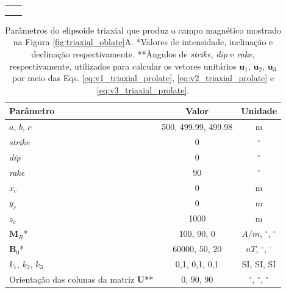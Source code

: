 \begin{table}[h!]
	\begin{center}
		\begin{tabular}{lc}
			
			&  \\
			& \\
			& \\
		\end{tabular}
	\end{center}
\end{table}

\begin{table}[h!]
	\begin{center}
		\begin{tabular}{|l|c|c|}
			\hline
			\textbf{Parâmetro}  & \textbf{Valor} & \textbf{Unidade} \\
			\hline 
			$a$, $b$, $c$   & 500, 499.99, 499.98 & m\\
			\hline
			\textit{strike}   & $0$ & $^{\circ}$\\
			\hline
			\textit{dip}   & $0$ & $^{\circ}$\\
			\hline
			\textit{rake}   & $90$  & $^{\circ}$\\
			\hline
			$x_c$   & 0  & m\\
			\hline          
			$y_c$   & 0  & m\\
			\hline                
			$z_c$   & 1000 & m \\
			\hline
			$\mathbf{M}_{R}$*  & 100, $90$, $0$ & $A/m$, $^{\circ}$, $^{\circ}$ \\
			\hline
			$\mathbf{B}_{0}$*    & 60000, $50$, $20$ & $nT$, $^{\circ}$, $^{\circ}$ \\
			\hline
			$k_{1}$, $k_{2}$, $k_{3}$   & 0,1, 0,1, 0,1 & SI, SI, SI \\
			\hline
			Orientação das colunas da matriz $\mathbf{U}$**  & $0$, $90$, $90$ & $^{\circ}$, $^{\circ}$, $^{\circ}$ \\
			\hline
		\end{tabular}
		\caption{Parâmetros do elipsoide triaxial que produz o campo magnético mostrado na Figura \ref{fig:triaxial_oblate}A. *Valores de intensidade, inclinação e declinação respectivamente. **Ângulos de \textit{strike}, \textit{dip}  e \textit{rake}, respectivamente, utilizados para calcular os vetores unitários $\mathbf{u}_{1}$, $\mathbf{u}_{2}$, $\mathbf{u}_{3}$ por meio das Eqs. \ref{eq:v1_triaxial_prolate}, \ref{eq:v2_triaxial_prolate} e \ref{eq:v3_triaxial_prolate}.}
	\end{center}
	\label{tab:triaxial_oblate1}
\end{table}

